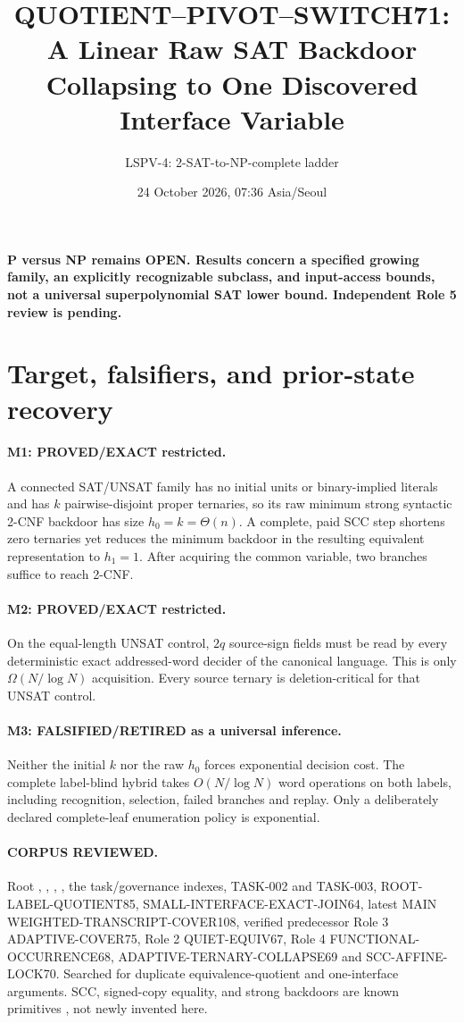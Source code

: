 \documentclass[11pt]{article}
\title{QUOTIENT--PIVOT--SWITCH71: A Linear Raw SAT Backdoor
Collapsing to One Discovered Interface Variable}
\author{LSPV-4: 2-SAT-to-NP-complete ladder}
\date{24 October 2026, 07:36 Asia/Seoul}
\begin{document}
\maketitle
\begin{center}\textbf{P versus NP remains OPEN. Results concern a specified
growing family, an explicitly recognizable subclass, and input-access
bounds, not a universal superpolynomial SAT lower bound.
Independent Role 5 review is pending.}\end{center}

\section{Target, falsifiers, and prior-state recovery}
\paragraph{M1: PROVED/EXACT restricted.}
A connected SAT/UNSAT family has no initial units or binary-implied literals
and has $k$ pairwise-disjoint proper ternaries, so its raw minimum
strong syntactic 2-CNF backdoor has size $h_0=k=\Theta(n)$.
A complete, paid SCC step shortens zero ternaries yet reduces the minimum
backdoor in the resulting equivalent representation to $h_1=1$.
After acquiring the common variable, two branches suffice to reach 2-CNF.
\paragraph{M2: PROVED/EXACT restricted.}
On the equal-length UNSAT control, $2q$ source-sign fields must be read
by every deterministic exact addressed-word decider of the canonical
language. This is only $\Omega(N/\log N)$ acquisition.
Every source ternary is deletion-critical for that UNSAT control.
\paragraph{M3: FALSIFIED/RETIRED as a universal inference.}
Neither the initial $k$ nor the raw $h_0$ forces exponential decision
cost. The complete label-blind hybrid takes $O(N/\log N)$ word operations
on both labels, including recognition, selection, failed branches and replay.
Only a deliberately declared complete-leaf enumeration policy is exponential.

\paragraph{CORPUS REVIEWED.}
Root , , ,
, the task/governance indexes,
TASK-002 and TASK-003, ROOT-LABEL-QUOTIENT85,
SMALL-INTERFACE-EXACT-JOIN64, latest MAIN WEIGHTED-TRANSCRIPT-COVER108,
verified predecessor Role 3 ADAPTIVE-COVER75, Role 2 QUIET-EQUIV67,
Role 4 FUNCTIONAL-OCCURRENCE68, ADAPTIVE-TERNARY-COLLAPSE69 and
SCC-AFFINE-LOCK70. Searched for duplicate equivalence-quotient and
one-interface arguments. SCC, signed-copy equality, and strong backdoors
are known primitives \cite{apt,wgs,hetero}, not newly invented here.
\end{document}
